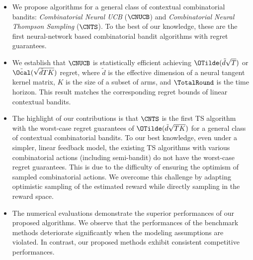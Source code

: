 \documentclass{article}
\theoremstyle{plain}
\begin{document}
\begin{itemize}
    \item We propose  algorithms for a general class of contextual combinatorial bandits: \textit{Combinatorial Neural UCB} ($\CNUCB$) and \textit{Combinatorial Neural Thompson Sampling} ($\CNTS$). To the best of our knowledge, these are the first neural-network based combinatorial bandit algorithms with regret guarantees.
    \item We establish that $\CNUCB$ is statistically efficient achieving $\OTilde(\tilde{d} \sqrt{T})$ or $\tilde{\Ocal}(\sqrt{\tilde{d} T K}) $ regret, where $\tilde{d}$ is the effective dimension of a neural tangent kernel matrix, $K$ is the size of a subset of arms, and $\TotalRound$ is the time horizon. This result matches the corresponding regret bounds of linear contextual bandits. 
    \item The highlight of our contributions is that $\CNTS$ is the first TS algorithm with the worst-case regret guarantees of $\OTilde( \tilde{d} \sqrt{T K})$ for a general class of contextual combinatorial bandits. 
    To our best knowledge, even under a simpler, linear feedback model, the existing TS algorithms with various combinatorial actions (including semi-bandit) do not have the worst-case regret guarantees. 
    This is due to the difficulty of ensuring the optimism of sampled combinatorial actions. We overcome this challenge by adapting optimistic sampling of the estimated reward while directly sampling in the reward space.
    \item The numerical evaluations demonstrate the superior performances of our proposed algorithms. We observe that the performances of the benchmark methods deteriorate significantly when the modeling assumptions are violated. In contrast, our proposed methods exhibit consistent competitive performances. 
\end{itemize}



\end{document}
